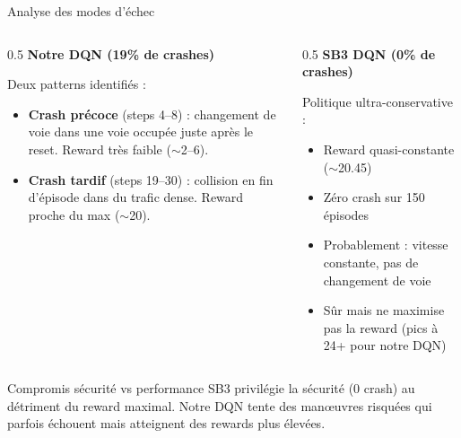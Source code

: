 \documentclass[10pt]{beamer}
\begin{document}
\begin{frame}{Analyse des modes d'\'echec}
    \begin{columns}
        \begin{column}{0.5\textwidth}
            \textbf{Notre DQN (19\% de crashes)}

            \vspace{0.2cm}
            Deux patterns identifi\'es :
            \begin{itemize}
                \item \textbf{Crash pr\'ecoce} (steps 4--8) : changement de voie dans une voie occup\'ee juste apr\`es le reset. Reward tr\`es faible ($\sim$2--6).
                \item \textbf{Crash tardif} (steps 19--30) : collision en fin d'\'episode dans du trafic dense. Reward proche du max ($\sim$20).
            \end{itemize}
        \end{column}
        \begin{column}{0.5\textwidth}
            \textbf{SB3 DQN (0\% de crashes)}

            \vspace{0.2cm}
            Politique ultra-conservative :
            \begin{itemize}
                \item Reward quasi-constante ($\sim$20.45)
                \item Z\'ero crash sur 150 \'episodes
                \item Probablement : vitesse constante, pas de changement de voie
                \item S\^ur mais ne maximise pas la reward (pics \`a 24+ pour notre DQN)
            \end{itemize}
        \end{column}
    \end{columns}

    \vspace{0.3cm}
    \begin{block}{Compromis s\'ecurit\'e vs performance}
        SB3 privil\'egie la s\'ecurit\'e (0 crash) au d\'etriment du reward maximal. Notre DQN tente des man\oe uvres risqu\'ees qui parfois \'echouent mais atteignent des rewards plus \'elev\'ees.
    \end{block}
\end{frame}
\end{document}
